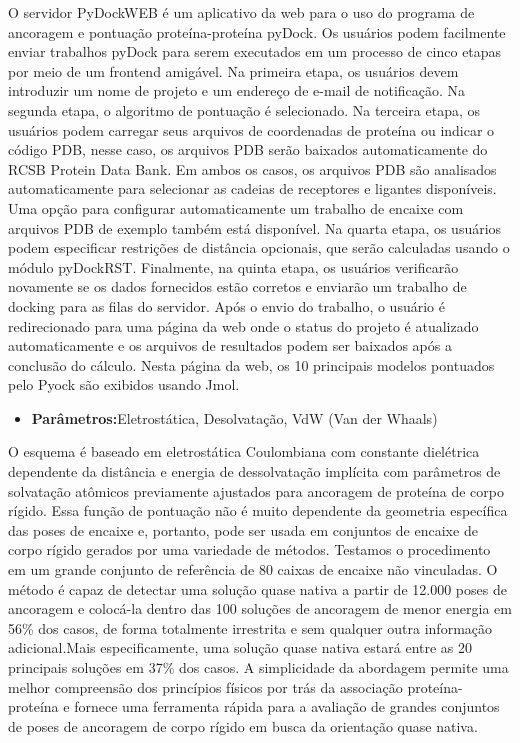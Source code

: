 \documentclass[11pt, letterpaper, portuguese]{article}
\begin{document}
    \par{O servidor PyDockWEB é um aplicativo da web para o uso do programa de ancoragem e pontuação proteína-proteína pyDock. Os usuários podem facilmente enviar trabalhos pyDock para serem executados em um processo de cinco etapas por meio de um frontend amigável. Na primeira etapa, os usuários devem introduzir um nome de projeto e um endereço de e-mail de notificação. Na segunda etapa, o algoritmo de pontuação é selecionado. Na terceira etapa, os usuários podem carregar seus arquivos de coordenadas de proteína ou indicar o código PDB, nesse caso, os arquivos PDB serão baixados automaticamente do RCSB Protein Data Bank. Em ambos os casos, os arquivos PDB são analisados ​​automaticamente para selecionar as cadeias de receptores e ligantes disponíveis. Uma opção para configurar automaticamente um trabalho de encaixe com arquivos PDB de exemplo também está disponível. Na quarta etapa, os usuários podem especificar restrições de distância opcionais, que serão calculadas usando o módulo pyDockRST. Finalmente, na quinta etapa, os usuários verificarão novamente se os dados fornecidos estão corretos e enviarão um trabalho de docking para as filas do servidor. Após o envio do trabalho, o usuário é redirecionado para uma página da web onde o status do projeto é atualizado automaticamente e os arquivos de resultados podem ser baixados após a conclusão do cálculo. Nesta página da web, os 10 principais modelos pontuados pelo Pyock são exibidos usando Jmol.}

\begin{itemize}
    \item  \textbf{Parâmetros:}Eletrostática, Desolvatação, VdW (Van der Whaals)
\end{itemize}
   
    \par{O esquema é baseado em eletrostática Coulombiana com constante dielétrica dependente da distância e energia de dessolvatação implícita com parâmetros de solvatação atômicos previamente ajustados para ancoragem de proteína de corpo rígido. Essa função de pontuação não é muito dependente da geometria específica das poses de encaixe e, portanto, pode ser usada em conjuntos de encaixe de corpo rígido gerados por uma variedade de métodos. Testamos o procedimento em um grande conjunto de referência de 80 caixas de encaixe não vinculadas. O método é capaz de detectar uma solução quase nativa a partir de 12.000 poses de ancoragem e colocá-la dentro das 100 soluções de ancoragem de menor energia em 56\% dos casos, de forma totalmente irrestrita e sem qualquer outra informação adicional.Mais especificamente, uma solução quase nativa estará entre as 20 principais soluções em 37\% dos casos. A simplicidade da abordagem permite uma melhor compreensão dos princípios físicos por trás da associação proteína-proteína e fornece uma ferramenta rápida para a avaliação de grandes conjuntos de poses de ancoragem de corpo rígido em busca da orientação quase nativa.}
    
\end{document}
